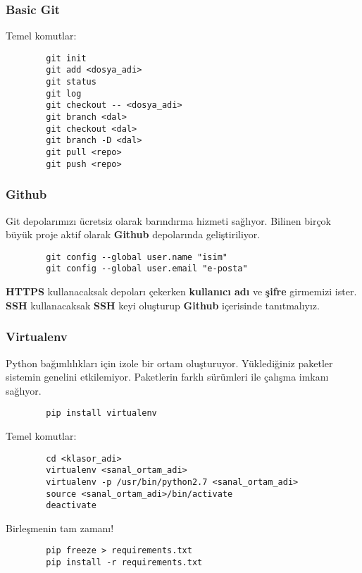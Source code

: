 \documentclass[10pt, compress]{beamer}
\begin{document}
\begin{frame}[fragile]
\frametitle{Basic Git}
    Temel komutlar:
    \begin{verbatim}
        git init
        git add <dosya_adi>
        git status
        git log
        git checkout -- <dosya_adi>
        git branch <dal>
        git checkout <dal>
        git branch -D <dal>
        git pull <repo>
        git push <repo>
    \end{verbatim}    
\end{frame}

\begin{frame}[fragile]
\frametitle{Github}
    Git depolarımızı ücretsiz olarak barındırma hizmeti sağlıyor. Bilinen birçok büyük proje aktif olarak \textbf{Github} depolarında geliştiriliyor.
    \begin{verbatim}
        git config --global user.name "isim"
        git config --global user.email "e-posta"
    \end{verbatim}      
    \textbf{HTTPS} kullanacaksak depoları çekerken \textbf{kullanıcı adı} ve \textbf{şifre} girmemizi ister. \textbf{SSH} kullanacaksak \textbf{SSH} keyi oluşturup \textbf{Github} içerisinde tanıtmalıyız.
\end{frame}


\begin{frame}[fragile]
\frametitle{Virtualenv}
    Python bağımlılıkları için izole bir ortam oluşturuyor. Yüklediğiniz paketler sistemin genelini etkilemiyor. Paketlerin farklı sürümleri ile çalışma imkanı sağlıyor.
    \begin{verbatim}
        pip install virtualenv
    \end{verbatim}  
    Temel komutlar:
    \begin{verbatim}
        cd <klasor_adi>
        virtualenv <sanal_ortam_adi>
        virtualenv -p /usr/bin/python2.7 <sanal_ortam_adi>
        source <sanal_ortam_adi>/bin/activate
        deactivate
    \end{verbatim}    
    Birleşmenin tam zamanı!
    \begin{verbatim}
        pip freeze > requirements.txt
        pip install -r requirements.txt
    \end{verbatim}       
\end{frame}
\end{document}
